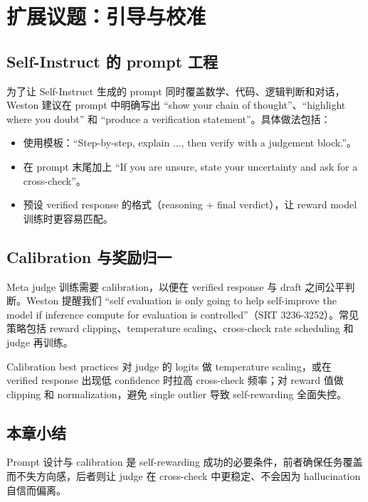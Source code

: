 \section{扩展议题：引导与校准}
\subsection{Self-Instruct 的 prompt 工程}
为了让 Self-Instruct 生成的 prompt 同时覆盖数学、代码、逻辑判断和对话，Weston 建议在 prompt 中明确写出 ``show your chain of thought''、``highlight where you doubt'' 和 ``produce a verification statement''。具体做法包括：
\begin{itemize}
    \item 使用模板：``Step-by-step, explain ..., then verify with a judgement block.''。
    \item 在 prompt 末尾加上 ``If you are unsure, state your uncertainty and ask for a cross-check''。
    \item 预设 verified response 的格式（reasoning + final verdict），让 reward model 训练时更容易匹配。
\end{itemize}
\mbox{}

\subsection{Calibration 与奖励归一}
Meta judge 训练需要 calibration，以便在 verified response 与 draft 之间公平判断。Weston 提醒我们 ``self evaluation is only going to help self-improve the model if inference compute for evaluation is controlled''（SRT 3236-3252）。常见策略包括 reward clipping、temperature scaling、cross-check rate scheduling 和 judge 再训练。

\begin{knowledgebox}{Calibration best practices}
对 judge 的 logits 做 temperature scaling，或在 verified response 出现低 confidence 时拉高 cross-check 频率；对 reward 值做 clipping 和 normalization，避免 single outlier 导致 self-rewarding 全面失控。
\end{knowledgebox}

\subsection{本章小结}
Prompt 设计与 calibration 是 self-rewarding 成功的必要条件，前者确保任务覆盖而不失方向感，后者则让 judge 在 cross-check 中更稳定、不会因为 hallucination 自信而偏离。

